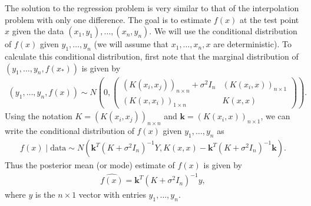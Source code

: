 \documentclass{scrartcl}
\begin{document}
The solution to the regression problem is very similar to that of the
interpolation problem with only one difference. The goal is to
estimate $f(x)$ at the test point $x$ given the data $(x_1, y_1),
\dots, (x_n, y_n)$. We will use the conditional distribution of $f(x)$
given $y_1, \dots, y_n$ (we will assume that $x_1, \dots, x_n, x$ are
deterministic). To calculate this conditional distribution, first note
that the marginal distribution of $(y_1, \dots, y_n, 
f(x_*))$ is given by
\begin{align*}
  (y_1, \dots, y_n, f(x)) \sim N \left(0, \begin{pmatrix} (K(x_i, 
                                             x_j))_{n \times n} +
                                             \sigma^2 I_n & (K(x_i,
                                                            x))_{n
                                                            \times 1}
                                             \\ (K(x, x_i))_{1
                                             \times n} & K(x,
                                                         x) \end{pmatrix}
  \right). 
\end{align*}
Using the notation $K = (K(x_i, 
                                             x_j))_{n \times n}$ and
                                             $\mathbf{k} = (K(x_i,
                                                            x))_{n
                                                            \times
                                                            1}$, we
                                                          can write
                                                          the
                                                          conditional
                                                          distribution
                                                          of
                                                          $f(x)$
                                                          given $y_1,
                                                          \dots, 
y_n$ as
\begin{align*}
  f(x) \mid \text{data} \sim N\left(\mathbf{k}^T \left(K +
  \sigma^2 I_n \right)^{-1} Y, K(x, x) - \mathbf{k}^T \left(K +
  \sigma^2 I_n
  \right)^{-1} \mathbf{k} \right).
\end{align*}
Thus the posterior mean (or mode) estimate of $f(x)$ is given by
\begin{align}\label{posmean}
  \widehat{f(x)} = \mathbf{k}^T \left(K +
  \sigma^2 I_n \right)^{-1} y, 
\end{align}
where $y$ is the $n \times 1$ vector with entries $y_1, \dots, y_n$.
\end{document}
